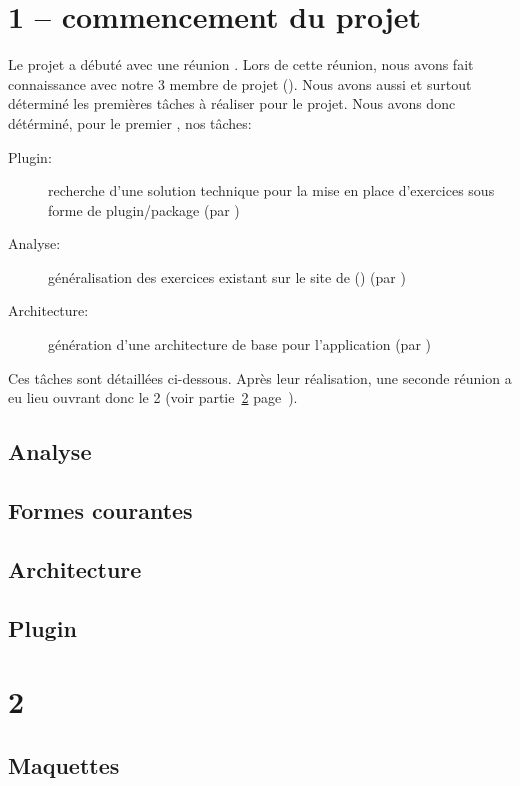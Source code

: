 \documentclass[french]{report}
\begin{document}
\section{1\ier{} \sprint{} -- commencement du projet}
\label{sprint1}
Le projet a débuté avec une réunion%
. Lors de cette réunion, nous avons fait connaissance avec notre 3\ieme{} membre de projet (\etudiantSL{}). Nous avons aussi et surtout déterminé les premières t\^{a}ches à réaliser pour le projet.
Nous avons donc détérminé, pour le premier \sprint{}, nos t\^aches:
\begin{description}
	\item[Plugin:] recherche d'une solution technique pour la mise en place d'exercices sous forme de plugin/package (par \etudiantSL{})
	\item[Analyse:] \og{}généralisation\fg{} des exercices existant sur le site de \pepit{} (\pepitSite{}) (par \etudiantRD{})
	\item[Architecture:] génération d'une architecture de base pour l'application (par \etudiantJP{})
\end{description}
Ces tâches sont détaillées ci-dessous. Après leur réalisation, une seconde réunion a eu lieu ouvrant donc le 2\ieme{} \sprint{} (voir partie~\ref{sprint2} page~\pageref{sprint2}).
\subsection{Analyse}
\label{partie_analyse}

\subsection{Formes courantes}
\label{partie_formes_courantes}

\subsection{Architecture}
\label{partie_architecture}

\subsection{Plugin}
\label{partie_plugin}

\section{2\ieme{} \sprint{}}
\label{sprint2}
\subsection{Maquettes}
\label{partie_maquettes}

\end{document}
